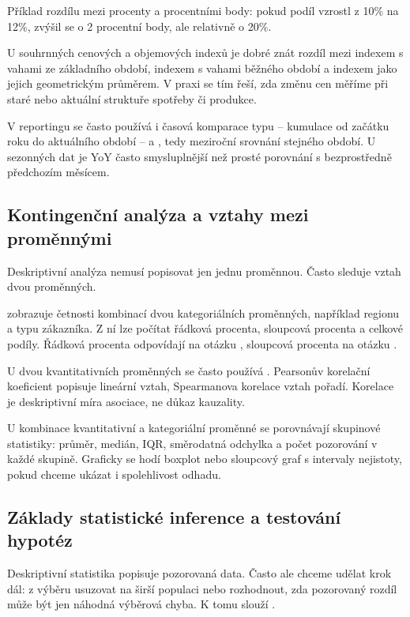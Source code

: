 Příklad rozdílu mezi procenty a procentními body: pokud podíl vzrostl z 10\% na 12\%, zvýšil se o
2 procentní body, ale relativně o 20\%.

U souhrnných cenových a objemových indexů je dobré znát rozdíl mezi  indexem
s vahami ze základního období,  indexem s vahami běžného období a 
indexem jako jejich geometrickým průměrem. V praxi se tím řeší, zda změnu cen měříme při staré nebo
aktuální struktuře spotřeby či produkce.

V reportingu se často používá i časová komparace typu  -- kumulace od začátku roku do
aktuálního období -- a , tedy meziroční srovnání stejného období. U sezonných dat je YoY
často smysluplnější než prosté porovnání s bezprostředně předchozím měsícem.

\subsection{Kontingenční analýza a vztahy mezi proměnnými}
Deskriptivní analýza nemusí popisovat jen jednu proměnnou. Často sleduje vztah dvou proměnných.

 zobrazuje četnosti kombinací dvou kategoriálních proměnných, například
regionu a typu zákazníka. Z ní lze počítat řádková procenta, sloupcová procenta a celkové podíly.
Řádková procenta odpovídají na otázku , sloupcová procenta na
otázku .

U dvou kvantitativních proměnných se často používá . Pearsonův korelační koeficient
popisuje lineární vztah, Spearmanova korelace vztah pořadí. Korelace je deskriptivní míra asociace,
ne důkaz kauzality.

U kombinace kvantitativní a kategoriální proměnné se porovnávají skupinové statistiky: průměr, medián,
IQR, směrodatná odchylka a počet pozorování v každé skupině. Graficky se hodí boxplot nebo sloupcový
graf s intervaly nejistoty, pokud chceme ukázat i spolehlivost odhadu.

\subsection{Základy statistické inference a testování hypotéz}
Deskriptivní statistika popisuje pozorovaná data. Často ale chceme udělat krok dál: z výběru usuzovat
na širší populaci nebo rozhodnout, zda pozorovaný rozdíl může být jen náhodná výběrová chyba. K tomu
slouží .

